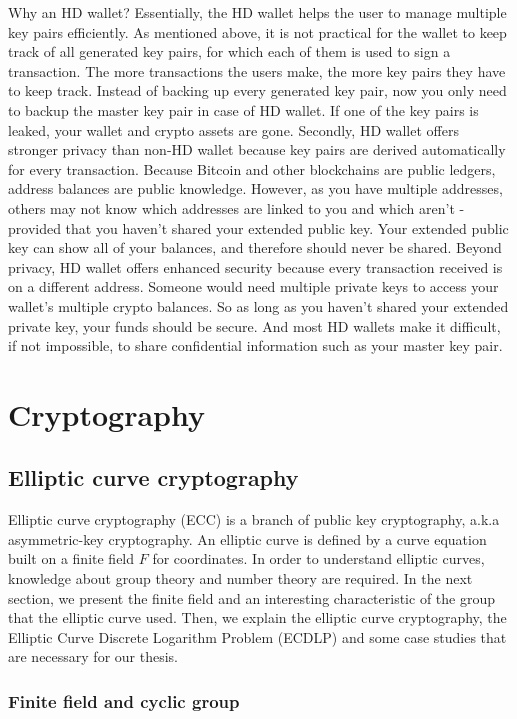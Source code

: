 Why an HD wallet? Essentially, the HD wallet helps the user to manage multiple key pairs efficiently. As mentioned above, it is not practical for the wallet to keep track of all generated key pairs, for which each of them is used to sign a transaction. The more transactions the users make, the more key pairs they have to keep track. Instead of backing up every generated key pair, now you only need to backup the master key pair in case of HD wallet. If one of the key pairs is leaked, your wallet and crypto assets are gone. Secondly,  HD wallet offers stronger privacy than non-HD wallet because key pairs are derived automatically for every transaction. Because Bitcoin and other blockchains are public ledgers, address balances are public knowledge. However, as you have multiple addresses, others may not know which addresses are linked to you and which aren’t - provided that you haven’t shared your extended public key. Your extended public key can show all of your balances, and therefore should never be shared. Beyond privacy, HD wallet offers enhanced security because every transaction received is on a different address. Someone would need multiple private keys to access your wallet’s multiple crypto balances. So as long as you haven’t shared your extended private key, your funds should be secure. And most HD wallets make it difficult, if not impossible, to share confidential information such as your master key pair.

\section{Cryptography}
\label{cryptography}

\subsection{Elliptic curve cryptography}

Elliptic curve cryptography (ECC) is a branch of public key cryptography, a.k.a asymmetric-key cryptography. An elliptic curve is defined by a curve equation built on a finite field $F$ for coordinates. In order to understand elliptic curves, knowledge about group theory and number theory are required. In the next section, we present the finite field and an interesting characteristic of the group that the elliptic curve used. Then, we explain the elliptic curve cryptography, the Elliptic Curve Discrete Logarithm Problem (ECDLP) and some case studies that are necessary for our thesis.

\subsubsection{Finite field and cyclic group}

